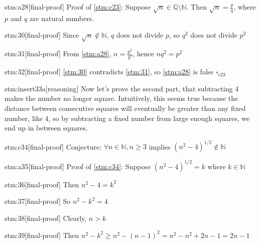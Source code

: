 \documentclass{article}
\begin{document}
\begin{stm}{stm:a28}[final-proof]
Proof of \ref{stm:c23}: Suppose $\sqrt{n} \in \mathbb{Q} \setminus \mathbb{N}$. Then $\sqrt{n} = \frac{p}{q}$, where $p$ and $q$ are natural numbers.
\end{stm}

\begin{stm}{stm:30}[final-proof]
Since $\sqrt{n} \notin \mathbb{N}$, $q$ does not divide $p$, so $q^2$ does not divide $p^2$
\end{stm}

\begin{stm}{stm:31}[final-proof]
From \ref{stm:a28}, $n = \frac{p^2}{q^2}$, hence $n q^2 = p^2$
\end{stm}

\begin{stm}{stm:32}[final-proof]
\ref{stm:30} contradicts \ref{stm:31}, so \ref{stm:a28} is false $\square_{c23}$
\end{stm}

\begin{stm}{stm:insert33a}[reasoning]
Now let's prove the second part, that subtracting 4 makes the number no longer square. Intuitively, this seems true because the distance between consecutive squares will eventually be greater than any fixed number, like 4, so by subtracting a fixed number from large enough squares, we end up in between squares.
\end{stm}

\begin{stm}{stm:c34}[final-proof]
Conjecture: $\forall n \in \mathbb{N}, n \ge 3$ implies $(n^2 - 4)^{1/2} \notin \mathbb{N}$
\end{stm}

\begin{stm}{stm:a35}[final-proof]
Proof of \ref{stm:c34}: Suppose $(n^2 - 4)^{1/2} = k$ where $k \in \mathbb{N}$
\end{stm}

\begin{stm}{stm:36}[final-proof]
Then $n^2 - 4 = k^2$
\end{stm}

\begin{stm}{stm:37}[final-proof]
So $n^2 - k^2 = 4$
\end{stm}

\begin{stm}{stm:38}[final-proof]
Clearly, $n > k$
\end{stm}

\begin{stm}{stm:39}[final-proof]
Then $n^2 - k^2 \ge n^2 - (n - 1)^2 = n^2 - n^2 + 2n - 1 = 2n - 1$
\end{stm}
\end{document}
